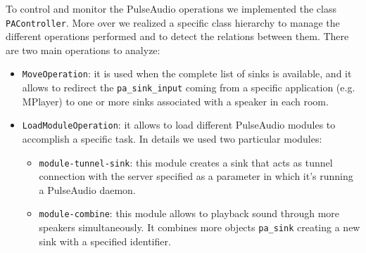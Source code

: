 \documentclass[conference]{IEEEtran}
\begin{document}
To control and monitor the PulseAudio operations we implemented the class \texttt{PAController}. More over we realized a specific class hierarchy to manage the different operations performed and to detect the relations between them. There are two main operations to analyze:
\begin{itemize}
\item \texttt{MoveOperation}: it is used when the complete list of sinks is available, and it allows to redirect the \texttt{pa\_sink\_input} coming from a specific application (e.g. MPlayer) to one or more sinks associated with a speaker in each room.
\item \texttt{LoadModuleOperation}: it allows to load different PulseAudio modules to accomplish a specific task. In details we used two particular modules:
	\begin{itemize}
	\item \texttt{module-tunnel-sink}: this module creates a sink that acts as tunnel connection with the server specified as a parameter in which it's running a PulseAudio daemon.
	\item \texttt{module-combine}: this module allows to playback sound through more speakers simultaneously. It combines more objects \texttt{pa\_sink} creating a new sink with a specified identifier.
	\end{itemize}
\end{itemize}

%
\end{document}
